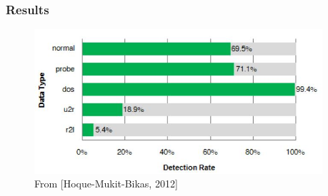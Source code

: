 \documentclass{beamer}
\begin{document}
\begin{frame}
  \frametitle{Results}


	\begin{figure}
  \includegraphics[width=0.95\textwidth]{../resultsForGA.JPG}
  \caption{From [Hoque-Mukit-Bikas, 2012]}
  	\end{figure}

\end{frame}
\end{document}
